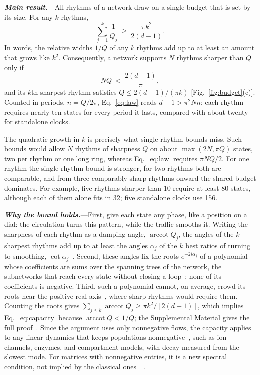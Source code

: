 \documentclass[aps,prl,twocolumn,superscriptaddress,amsmath,amssymb,floatfix,longbibliography]{revtex4-2}
\newcommand{\arccot}{\operatorname{arccot}}
\newcommand{\runin}[1]{\textit{\textbf{#1}}---}
\newcommand{\SMsec}[1]{\cite[Sec.~\ref{#1}]{SM}}
\begin{document}
\runin{Main result.}All rhythms of a network draw on a single budget that is set by its size. For any $k$ rhythms,
\begin{equation}
\sum_{j=1}^{k}\frac{1}{Q_j}\ \ge\ \frac{\pi k^{2}}{2(d-1)}.
\label{eq:capacity}
\end{equation}
In words, the relative widths $1/Q$ of any $k$ rhythms add up to at least an amount that grows like $k^2$. Consequently, a network supports $N$ rhythms sharper than $Q$ only if
\begin{equation}
NQ\ <\ \frac{2(d-1)}{\pi},
\label{eq:law}
\end{equation}
and its $k$th sharpest rhythm satisfies $Q\le2(d-1)/(\pi k)$ [Fig.~\ref{fig:budget}(c)]. Counted in periods, $n=Q/2\pi$, Eq.~\eqref{eq:law} reads $d-1>\pi^2Nn$: each rhythm requires nearly ten states for every period it lasts, compared with about twenty for standalone clocks.

The quadratic growth in $k$ is precisely what single-rhythm bounds miss. Such bounds would allow $N$ rhythms of sharpness $Q$ on about $\max(2N,\pi Q)$ states, two per rhythm or one long ring, whereas Eq.~\eqref{eq:law} requires $\pi NQ/2$. For one rhythm the single-rhythm bound is stronger, for two rhythms both are comparable, and from three comparably sharp rhythms onward the shared budget dominates. For example, five rhythms sharper than 10 require at least 80 states, although each of them alone fits in 32; five standalone clocks use 156.

\runin{Why the bound holds.}First, give each state any phase, like a position on a dial: the circulation turns this pattern, while the traffic smooths it. Writing the sharpness of each rhythm as a damping angle, $\arccot Q_j$, the angles of the $k$ sharpest rhythms add up to at least the angles $\alpha_j$ of the $k$ best ratios of turning to smoothing, $\cot\alpha_j$~\cite{horn1959,wang2020,furtado2001}. Second, these angles fix the roots $e^{-2i\alpha_j}$ of a polynomial whose coefficients are sums over the spanning trees of the network, the subnetworks that reach every state without closing a loop~\cite{chaiken1982}; none of its coefficients is negative. Third, such a polynomial cannot, on average, crowd its roots near the positive real axis~\cite{eremenko2016}, where sharp rhythms would require them. Counting the roots gives $\sum_{j\le k}\arccot Q_j\ge\pi k^2/[2(d-1)]$, which implies Eq.~\eqref{eq:capacity} because $\arccot Q<1/Q$; the Supplemental Material gives the full proof~\SMsec{sec:counting}. Since the argument uses only nonnegative flows, the capacity applies to any linear dynamics that keeps populations nonnegative~\cite{farina2000}, such as ion channels, enzymes, and compartment models, with decay measured from the slowest mode. For matrices with nonnegative entries, it is a new spectral condition, not implied by the classical ones~\cite{johnson1981,holtz2005}~\SMsec{sec:niep}.
\end{document}
